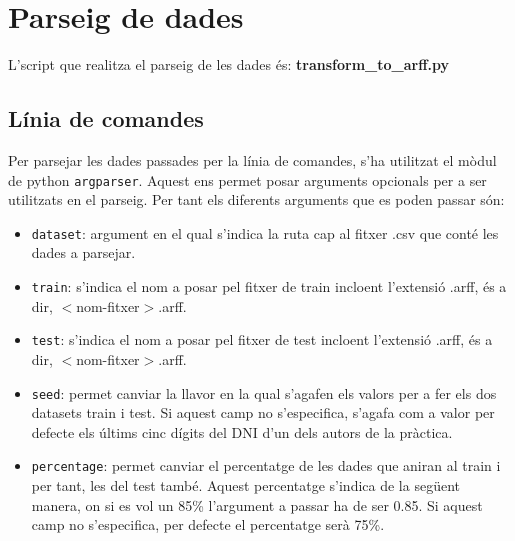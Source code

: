 \documentclass[../informe.tex]{subfiles}
\begin{document}
    \section{Parseig de dades}
    L'script que realitza el parseig de les dades és: \textbf{transform\_to\_arff.py}

    \subsection{Línia de comandes}
    Per parsejar les dades passades per la línia de comandes, s'ha utilitzat el mòdul de python \texttt{argparser}. Aquest ens permet posar arguments opcionals per a ser utilitzats en el parseig. Per tant els diferents arguments que es poden passar són:
    \begin{itemize}
        \item \texttt{dataset}: argument en el qual s'indica la ruta cap al fitxer .csv que conté les dades a parsejar. 
        \item \texttt{train}: s'indica el nom a posar pel fitxer de train incloent l'extensió .arff, és a dir, $<$nom-fitxer$>$.arff.
        \item \texttt{test}: s'indica el nom a posar pel fitxer de test incloent l'extensió .arff, és a dir, $<$nom-fitxer$>$.arff.
        \item \texttt{seed}: permet canviar la llavor en la qual s'agafen els valors per a fer els dos datasets train i test. Si aquest camp no s'especifica, s'agafa com a valor per defecte els últims cinc dígits del DNI d'un dels autors de la pràctica.
        \item \texttt{percentage}: permet canviar el percentatge de les dades que aniran al train i per tant, les del test també. Aquest percentatge s'indica de la següent manera, on si es vol un 85\% l'argument a passar ha de ser 0.85. Si aquest camp no s'especifica, per defecte el percentatge serà 75\%.
    \end{itemize}
\end{document}
